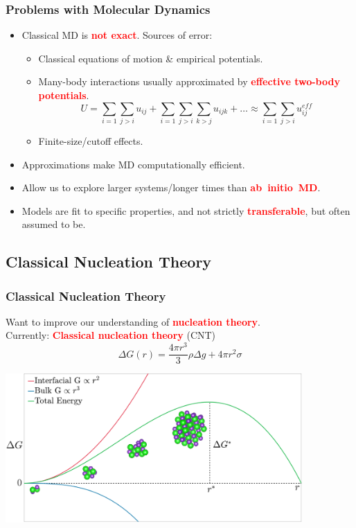 \documentclass{beamer}
\newcommand{\insertcurrentcitation}{}
\newcommand{\currentcitation}[1]{
	\renewcommand{\insertcurrentcitation}{#1}
} %
\newcommand{\bb}[1]{\textcolor{red}{\textbf{#1}}}
\begin{document}
\begin{frame}
\frametitle{Problems with Molecular Dynamics}
	\begin{itemize}
		\item Classical MD is \bb{not exact}. Sources of error:
		\begin{itemize}
			\item Classical equations of motion \& empirical potentials.
			\item Many-body interactions usually approximated by \bb{effective two-body potentials}.
			\begin{equation}
				U = \sum_{i=1}\sum_{j>i} u_{ij} + \sum_{i=1}\sum_{j>i} \sum_{k>j} u_{ijk} + \ldots \approx \sum_{i=1} \sum_{j>i} u^{eff}_{ij}
			\end{equation}
			\item Finite-size/cutoff effects.
		\end{itemize}
		\pause
		\item Approximations make MD computationally efficient.
		\item Allow us to explore larger systems/longer times than \mbox{\bb{ab initio MD}.}
		\item Models are fit to specific properties, and not strictly \bb{transferable}, but often assumed to be.
	\end{itemize}
\end{frame}

\currentcitation{\cite{Karthika2016}}
\subsection{Classical Nucleation Theory}
\begin{frame}
\frametitle{Classical Nucleation Theory}
Want to improve our understanding of \bb{nucleation theory}.\\
Currently: \bb{Classical nucleation theory} (CNT)
	\begin{equation}
	\Delta G (r) = \frac {4 \pi r ^ { 3 } } { 3  }\rho \Delta g + 4 \pi r^{ 2 } \sigma
	\end{equation}
	\pause
\begin{center}
	\includegraphics[trim={0cm 0cm 0cm 0cm},clip,width=0.85\textwidth]{figures/CNT.png}
\end{center}
\end{frame}
\end{document}

